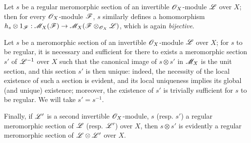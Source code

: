 \begin{env}[20.1.9]
\label{IV.20.1.9}
Let $s$ be a regular meromorphic section of an invertible $\mathscr{O}_X$-module $\mathscr{L}$ over $X$;
then for every $\mathscr{O}_X$-module $\mathscr{F}$, $s$ similarly defines a homomorphism $h_s\otimes 1_\sh{F}:\sh{M}_X(\sh{F})\to\sh{M}_X(\sh{F}\otimes_{\sh{O}_X}\sh{L})$, which is again \emph{bijective}.
\end{env}

\begin{env}[20.1.10]
\label{IV.20.1.10}
Let $s$ be a meromorphic section of an invertible $\mathscr{O}_X$-module $\mathscr{L}$ over $X$;
for $s$ to be regular, it is necessary and sufficient for there to exists a meromorphic section $s'$ of $\mathscr{L}^{-1}$ over $X$ such that the canonical image of $s\otimes s'$ in $\mathscr{M}_X$  is the unit section, and this section $s'$ is then unique: indeed, the necessity of the local existence of such a section is evident, and its local uniqueness implies its global (and unique) existence;
moreover, the existence of $s'$ is trivially sufficient for $s$ to be regular.
We will take $s'=s^{-1}$.

Finally, if $\mathscr{L}'$ is a second invertible $\mathscr{O}_X$-module, $s$ (resp. $s'$) a regular meromorphic section of $\mathscr{L}$ (resp. $\mathscr{L}'$) over $X$, then $s\otimes s'$ is evidently a regular meromorphic section of $\mathscr{L}\otimes\mathscr{L}'$ over $X$.
\end{env}

